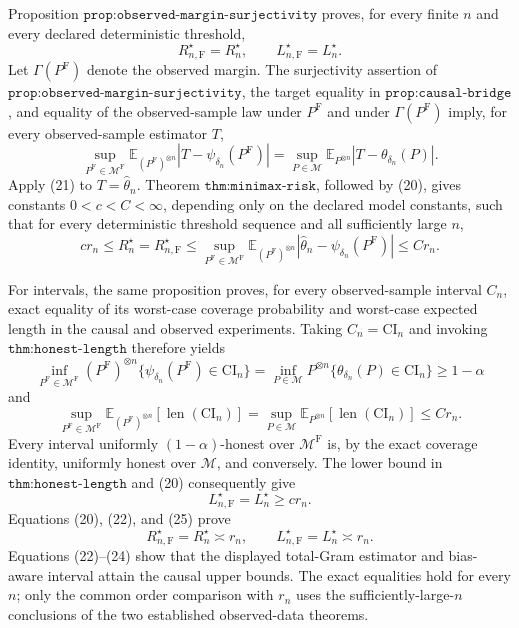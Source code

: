 Proposition \(\texttt{prop:observed-margin-surjectivity}\) proves, for every finite \(n\) and every declared deterministic threshold,
\[
 R_{n,\mathrm F}^\star=R_n^\star,
 \qquad
 L_{n,\mathrm F}^\star=L_n^\star.
 \tag{20}
\]
Let \(\Gamma(P^{\mathrm F})\) denote the observed margin.  The surjectivity assertion of \(\texttt{prop:observed-margin-surjectivity}\), the target equality in \(\texttt{prop:causal-bridge}\), and equality of the observed-sample law under \(P^{\mathrm F}\) and under \(\Gamma(P^{\mathrm F})\) imply, for every observed-sample estimator \(T\),
\[
 \sup_{P^{\mathrm F}\in\mathcal M^{\mathrm F}}
 \mathbb E_{(P^{\mathrm F})^{\otimes n}}
 |T-\psi_{\delta_n}(P^{\mathrm F})|
 =
 \sup_{P\in\mathcal M}
 \mathbb E_{P^{\otimes n}}|T-\theta_{\delta_n}(P)|.
 \tag{21}
\]
Apply (21) to \(T=\widehat\theta_n\).  Theorem \(\texttt{thm:minimax-risk}\), followed by (20), gives constants \(0<c<C<\infty\), depending only on the declared model constants, such that for every deterministic threshold sequence and all sufficiently large \(n\),
\[
 c r_n
 \leq R_n^\star=R_{n,\mathrm F}^\star
 \leq
 \sup_{P^{\mathrm F}\in\mathcal M^{\mathrm F}}
 \mathbb E_{(P^{\mathrm F})^{\otimes n}}
 |\widehat\theta_n-\psi_{\delta_n}(P^{\mathrm F})|
 \leq C r_n.
 \tag{22}
\]

For intervals, the same proposition proves, for every observed-sample interval \(C_n\), exact equality of its worst-case coverage probability and worst-case expected length in the causal and observed experiments.  Taking \(C_n=\mathrm{CI}_n\) and invoking \(\texttt{thm:honest-length}\) therefore yields
\[
 \inf_{P^{\mathrm F}\in\mathcal M^{\mathrm F}}
 (P^{\mathrm F})^{\otimes n}
 \{\psi_{\delta_n}(P^{\mathrm F})\in\mathrm{CI}_n\}
 =
 \inf_{P\in\mathcal M}P^{\otimes n}
 \{\theta_{\delta_n}(P)\in\mathrm{CI}_n\}
 \geq1-\alpha
 \tag{23}
\]
and
\[
 \sup_{P^{\mathrm F}\in\mathcal M^{\mathrm F}}
 \mathbb E_{(P^{\mathrm F})^{\otimes n}}[\operatorname{len}(\mathrm{CI}_n)]
 =
 \sup_{P\in\mathcal M}
 \mathbb E_{P^{\otimes n}}[\operatorname{len}(\mathrm{CI}_n)]
 \leq C r_n.
 \tag{24}
\]
Every interval uniformly \((1-\alpha)\)-honest over \(\mathcal M^{\mathrm F}\) is, by the exact coverage identity, uniformly honest over \(\mathcal M\), and conversely.  The lower bound in \(\texttt{thm:honest-length}\) and (20) consequently give
\[
 L_{n,\mathrm F}^\star=L_n^\star\geq c r_n.
 \tag{25}
\]
Equations (20), (22), and (25) prove
\[
 R_{n,\mathrm F}^\star=R_n^\star\asymp r_n,
 \qquad
 L_{n,\mathrm F}^\star=L_n^\star\asymp r_n.
\]
Equations (22)--(24) show that the displayed total-Gram estimator and bias-aware interval attain the causal upper bounds.  The exact equalities hold for every \(n\); only the common order comparison with \(r_n\) uses the sufficiently-large-\(n\) conclusions of the two established observed-data theorems.